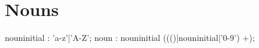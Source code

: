 \documentclass[a4paper]{book}
\begin{document}
\section{Nouns}
\begin{rail}
    nouninitial : 'a-z'|'A-Z';
    noun : nouninitial ((()|nouninitial|'0-9') +);
\end{rail}
%
%
%
%
%
%
\end{document}
